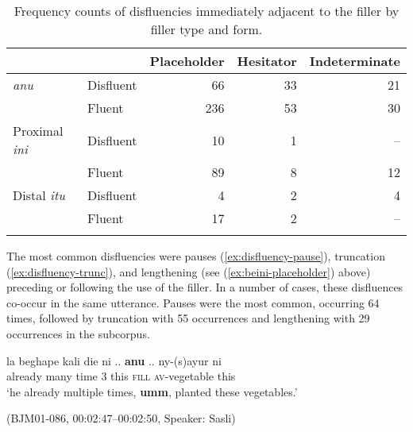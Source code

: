 \documentclass[output=paper,
\ChapterDOI{10.5281/zenodo.15697583}
colorlinks,
citecolor=brown]{langscibook}
\begin{document}
\begin{table}
\caption{Frequency counts of disfluencies immediately adjacent to the filler by filler type and form.}
\label{tab:disfluency}
\begin{tabular}{llrrr}
\lsptoprule
  & &  {Placeholder} &  {Hesitator} &  {Indeterminate} \\
\midrule
  {\textit{anu}} &  {Disfluent} & 66 & 33 & 21 \\
                 &  {Fluent}    & 236 & 53 & 30 \\
\tablevspace
  {Proximal \textit{ini}} &  {Disfluent} & 10 & 1 & -- \\
                          &  {Fluent} & 89 & 8 & 12 \\
\tablevspace
  {Distal \textit{itu}} &  {Disfluent} & 4 & 2 & 4 \\
                        &  {Fluent} & 17  & 2 & -- \\
\lspbottomrule
\end{tabular}
\end{table}

The most common disfluencies were pauses (\ref{ex:disfluency-pause}), truncation (\ref{ex:disfluency-trunc}), and lengthening (see (\ref{ex:beini-placeholder}) above) preceding or following the use of the filler. In a number of cases, these disfluences co-occur in the same utterance. Pauses were the most common, occurring 64 times, followed by truncation with 55 occurrences and lengthening with 29 occurrences in the subcorpus.



\begin{exe}
\ex\label{ex:disfluency-pause} \begin{xlist}
\exi{} \gll
la beghape kali die ni {..} \textbf{anu} {..} ny-(s)ayur ni \\
already many time 3 this {} \textsc{fill} {} \textsc{av}-vegetable this \\
\glt `he already multiple times, \textbf{umm}, planted these vegetables.' \\
\end{xlist}
\hfill (BJM01-086, 00:02:47–00:02:50, Speaker: Sasli) 
\end{exe}
\end{document}
